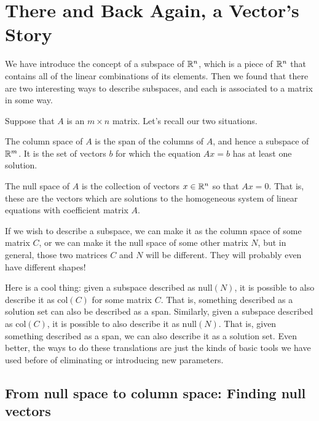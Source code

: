 \documentclass[elementsmain.tex]{subfiles}
\begin{document}
\section[There and Back Again]{There and Back Again, a Vector's Story}

We have introduce the concept of a subspace of $\mathbb{R}^n$, which is a piece of $\mathbb{R}^n$ that contains all of the linear combinations of its elements. Then we found that there are two interesting ways to describe subspaces, and each is associated to a matrix in some way.

Suppose that $A$ is an $m\times n$ matrix. Let's recall our two situations.

The column space of $A$ is the span of the columns of $A$, and hence a subspace of $\mathbb{R}^m$. It is the set of vectors $b$ for which the equation $Ax=b$ has at least one solution.

The null space of $A$ is the collection of vectors $x \in \mathbb{R}^n$ so that $Ax=0$. That is, these are the vectors which are solutions to the homogeneous system of linear equations with coefficient matrix $A$.

If we wish to describe a subspace, we can make it as the column space of some matrix $C$, or we can make it the null space of some other matrix $N$, but in general, those two matrices $C$ and $N$ will be different. They will probably even have different shapes!

Here is a cool thing: given a subspace described as $\mathrm{null}(N)$, it is possible to also describe it as $\mathrm{col}(C)$ for some matrix $C$. That is, something described as a solution set can also be described as a span. Similarly, given a subspace described as $\mathrm{col}(C)$, it is possible to also describe it as $\mathrm{null}(N)$. That is, given something described as a span, we can also describe it as a solution set. Even better, the ways to do these translations are just the kinds of basic tools we have used before of eliminating or introducing new parameters.


\subsection*{From null space to column space: Finding null vectors}
\end{document}
